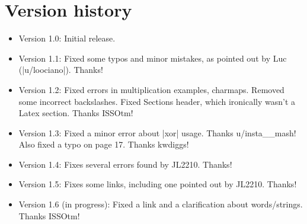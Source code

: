 \documentclass[11pt]{book}
\begin{document}
\chapter{Version history}
\begin{itemize}
\item Version 1.0: Initial release.
\item Version 1.1: Fixed some typos and minor mistakes, as pointed out by Luc (|u/loociano|). Thanks!
\item Version 1.2: Fixed errors in multiplication examples, charmaps. Removed some incorrect backslashes. Fixed Sections header, which ironically wasn't a Latex section. Thanks ISSOtm!
\item Version 1.3: Fixed a minor error about |xor| usage. Thanks u/insta\_\_mash! Also fixed a typo on page 17. Thanks kwdiggs!
\item Version 1.4: Fixes several errors found by JL2210. Thanks!
\item Version 1.5: Fixes some links, including one pointed out by JL2210. Thanks!
\item Version 1.6 (in progress): Fixed a link and a clarification about words/strings. Thanks ISSOtm!
\end{itemize}
\end{document}
